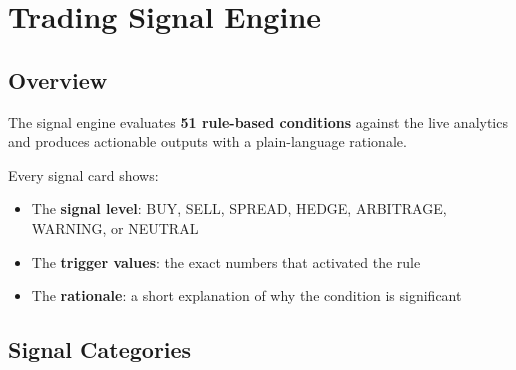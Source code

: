 \documentclass[11pt,a4paper]{article}
\begin{document}
\section{Trading Signal Engine}

\subsection{Overview}

The signal engine evaluates \textbf{51 rule-based conditions} against the live analytics and produces actionable outputs with a plain-language rationale.

Every signal card shows:
\begin{itemize}[itemsep=2pt]
\item The \textbf{signal level}: BUY, SELL, SPREAD, HEDGE, ARBITRAGE, WARNING, or NEUTRAL
\item The \textbf{trigger values}: the exact numbers that activated the rule
\item The \textbf{rationale}: a short explanation of why the condition is significant
\end{itemize}

\subsection{Signal Categories}
\end{document}
